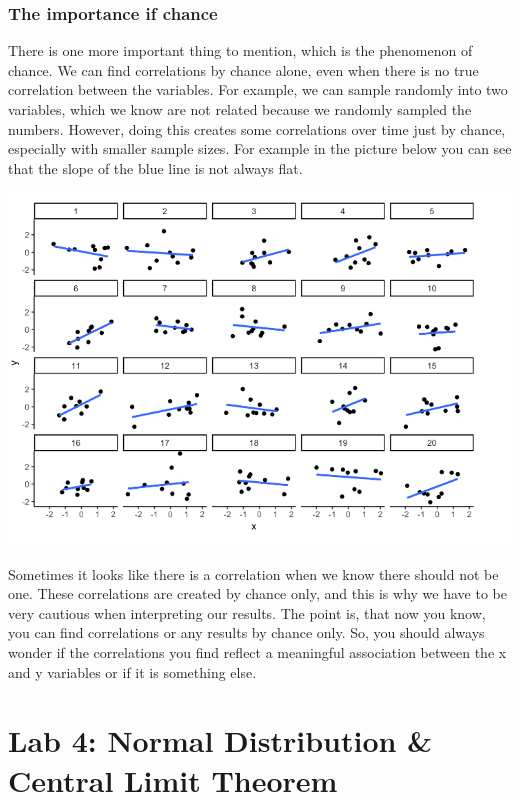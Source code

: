 \documentclass[
]{book}
\begin{document}
\hypertarget{the-importance-if-chance}{%
\subsection{The importance if chance}\label{the-importance-if-chance}}

There is one more important thing to mention, which is the phenomenon of chance. We can find correlations by chance alone, even when there is no true correlation between the variables. For example, we can sample randomly into two variables, which we know are not related because we randomly sampled the numbers. However, doing this creates some correlations over time just by chance, especially with smaller sample sizes. For example in the picture below you can see that the slope of the blue line is not always flat.

\includegraphics{img/ch3/corrchance.png}

Sometimes it looks like there is a correlation when we know there should not be one. These correlations are created by chance only, and this is why we have to be very cautious when interpreting our results. The point is, that now you know, you can find correlations or any results by chance only. So, you should always wonder if the correlations you find reflect a meaningful association between the x and y variables or if it is something else.

\hypertarget{lab-4-normal-distribution-central-limit-theorem}{%
\chapter{Lab 4: Normal Distribution \& Central Limit Theorem}\label{lab-4-normal-distribution-central-limit-theorem}}
\end{document}
